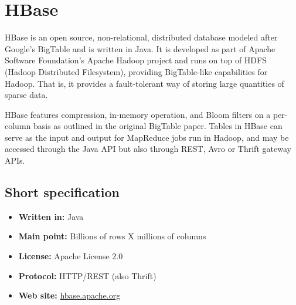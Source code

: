 \chapter{HBase}

HBase is an open source, non-relational, distributed database modeled after Google's BigTable and is written in Java. It is developed as part of Apache Software Foundation's Apache Hadoop project and runs on top of HDFS (Hadoop Distributed Filesystem), providing BigTable-like capabilities for Hadoop. That is, it provides a fault-tolerant way of storing large quantities of sparse data.

HBase features compression, in-memory operation, and Bloom filters on a per-column basis as outlined in the original BigTable paper. Tables in HBase can serve as the input and output for MapReduce jobs run in Hadoop, and may be accessed through the Java API but also through REST, Avro or Thrift gateway APIs.

\section{Short specification}

\begin{itemize}
  \item \textbf{Written in:} Java
  \item \textbf{Main point:} Billions of rows X millions of columns
  \item \textbf{License:} Apache License 2.0
  \item \textbf{Protocol:} HTTP/REST (also Thrift)
  \item \textbf{Web site:} \href{http://hbase.apache.org/}{hbase.apache.org}
\end{itemize}
